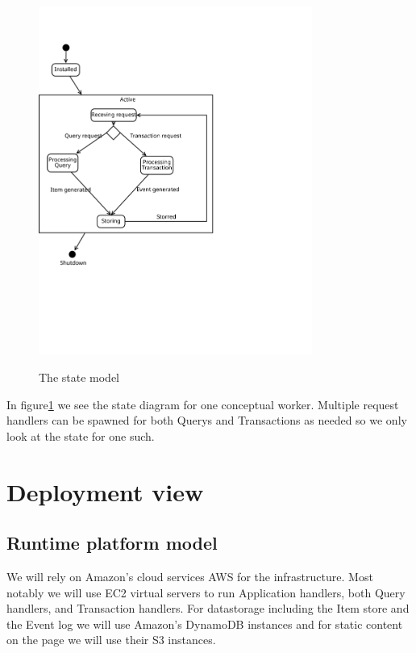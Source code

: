 \begin{figure}[h!]
  \centering
  \caption{The state model}
  \includegraphics[width=0.8\textwidth]{figures/state-model}
  \label{fig:state-model}
\end{figure}

In figure\ref{fig:state-model} we see the state diagram for one conceptual
worker. Multiple request handlers can be spawned for both Querys and
Transactions as needed so we only look at the state for one such.
\section{Deployment view}
\label{sec:deployment-view}


\subsection{Runtime platform model}
\label{sec:runt-platf-model}

We will rely on Amazon's cloud services AWS for the infrastructure.
Most notably we will use EC2 virtual servers to run Application handlers, both
Query handlers, and Transaction handlers. For datastorage including the Item
store and the Event log we will use Amazon's DynamoDB instances and for static
content on the page we will use their S3 instances.

